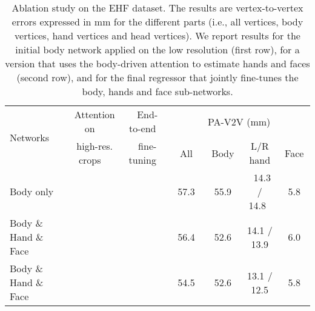 \documentclass[runningheads]{llncs}
\newcommand{\cmark}{\color{green}\ding{51}}
\newcommand{\xmark}{\color{red}\ding{55}}
\begin{document}
\begin{table}[t!]
    \centering
    \caption{Ablation study on the EHF dataset.
        The results are vertex-to-vertex errors expressed in mm for the different parts
        (i.e., all vertices, body vertices, hand vertices and head vertices).
        We report results for the initial body network applied on the low resolution (first row),
        for a version that uses the body-driven attention to estimate hands and faces (second row),
        and for the final regressor that jointly fine-tunes the body, hands and face sub-networks.
    }
    \scriptsize
    \begin{tabular}{l|c|c|c|c|c|c}
        \toprule
        \multirow{2}{*}{Networks} 	&	\multirow{1}{*}{~Attention on~}		& 	~End-to-end~		&  \multicolumn{4}{c}{PA-V2V (mm)} 						\\	\cline{4-7}
        	{}							& 	\multirow{1}{*}{~high-res. crops~}	& 	~fine-tuning~ 	&  All		&	Body		&	L/R hand			&	Face		\\
        \midrule
        Body only	 				& 	\xmark								& 	\xmark			& ~57.3~		&	~55.9~	&	~14.3 / 14.8~	&	~5.8~ 	\\
        Body \& Hand \& Face			& 	\cmark								& 	\xmark			&  56.4		&	 52.6	&	 14.1 / 13.9		&	 6.0		\\
        Body \& Hand \& Face			& 	\cmark								& 	\cmark			&  54.5		&	 52.6	&	 13.1 / 12.5		&	 5.8		\\
        \bottomrule \end{tabular}
    \label{table:ehf_ablative}
\end{table}
\end{document}
